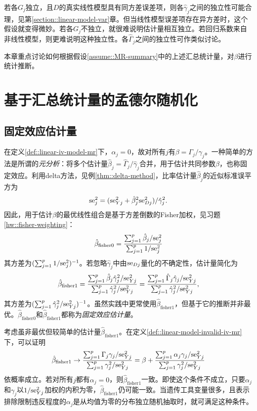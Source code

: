 若各$G_j$独立，且$D$的真实线性模型具有同方差误差项，则各$\hat{\gamma}_j$之间的独立性可能合理，见第\ref{section::linear-model-var}章。但当线性模型误差项存在异方差时，这个假设就变得微妙。若各$G_j$不独立，就很难说明估计量相互独立。若回归系数来自非线性模型，则更难说明这种独立性。各$\hat{\Gamma}_j$之间的独立性可作类似讨论。 

本章重点讨论如何根据假设\ref{assume::MR-summary}中的上述汇总统计量，对$\beta$进行统计推断。 



\section{基于汇总统计量的孟德尔随机化}


\subsection{固定效应估计量}\label{sec::mr-fixed-effect}


在定义\ref{def::linear-iv-model-mr}下，$\alpha_j = 0$，故对所有$j$有$\beta = \Gamma_j / \gamma_j$。一种简单的方法是所谓的{\it 元分析}\citep{bowden2018improving}：将多个估计量$\hat{\beta}_j =  \hat \Gamma_j / \hat\gamma_j$合并，用于估计共同参数$\beta$，也称固定效应。利用delta方法，见例\ref{thm::delta-method}，比率估计量$\hat{\beta}_j$的近似标准误平方为$$
\textup{se}_j^2 = (\textup{se}_{Yj}^2 + \hat{\beta}_j^2\textup{se}_{Dj}^2  )    / \hat\gamma_j^2.
$$因此，用于估计$\beta$的最优线性组合是基于方差倒数的Fisher加权，见习题\ref{hw::fisher-weighting}：$$
\hat{\beta}_{\text{fisher}0} =  \frac{ \sum_{j=1}^p  \hat{\beta}_j  / \textup{se}_j^2  }{ \sum_{j=1}^p 1  / \textup{se}_j^2 }
$$其方差为$(\sum_{j=1}^p 1  / \textup{se}_j^2)^{-1} $。若忽略$\hat\gamma_j$中由$\textup{se}_{Dj}$量化的不确定性，估计量简化为$$
\hat{\beta}_{\text{fisher}1} =  \frac{ \sum_{j=1}^p  \hat{\beta}_j  \hat\gamma_j^2 /  \textup{se}_{Yj}^2 }{ \sum_{j=1}^p   \hat\gamma_j^2 /  \textup{se}_{Yj}^2 }
=\frac{ \sum_{j=1}^p  \hat \Gamma_j   \hat\gamma_j /  \textup{se}_{Yj}^2 }{ \sum_{j=1}^p   \hat\gamma_j^2 /  \textup{se}_{Yj}^2 },
$$其方差为$( \sum_{j=1}^p   \hat\gamma_j^2 /  \textup{se}_{Yj}^2 )^{-1}$。虽然实践中更常使用$\hat{\beta}_{\text{fisher}1} $，但基于它的推断并非最优\citep{bowden2018improving}。$\hat{\beta}_{\text{fisher}0}$和$\hat{\beta}_{\text{fisher}1}$都称为{\it 固定效应估计量}。 


考虑虽非最优但较简单的估计量$\hat{\beta}_{\text{fisher}1}$。在定义\ref{def::linear-model-invalid-iv-mr}下，可以证明$$
\hat{\beta}_{\text{fisher}1}  \rightarrow 
\frac{ \sum_{j=1}^p   \Gamma_j    \gamma_j /  \textup{se}_{Yj}^2 }{ \sum_{j=1}^p    \gamma_j^2 /  \textup{se}_{Yj}^2 }
= \beta + \frac{ \sum_{j=1}^p   \alpha_j    \gamma_j /  \textup{se}_{Yj}^2 }{ \sum_{j=1}^p    \gamma_j^2 /  \textup{se}_{Yj}^2 }
$$依概率成立。若对所有$j$都有$\alpha_j = 0$，则$\hat{\beta}_{\text{fisher}1} $一致。即使这个条件不成立，只要$\alpha_j  $和$  \gamma_j$以$ 1/  \textup{se}_{Yj}^2$加权的内积为零，$\hat{\beta}_{\text{fisher}1}  $仍可能一致。当遗传工具变量很多，且表示排除限制违反程度的$\alpha_j$是从均值为零的分布独立随机抽取时，就可满足这种条件。 


